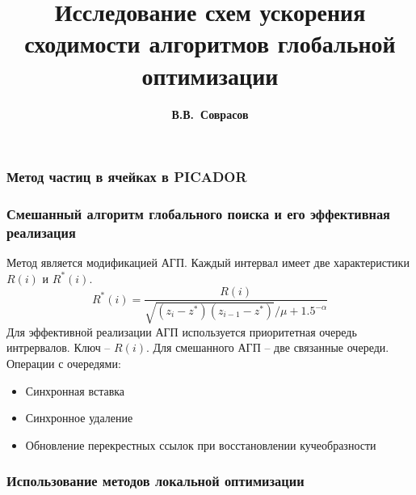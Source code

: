 \documentclass{beamer}
\title{Исследование схем ускорения сходимости алгоритмов глобальной оптимизации}
\author{\textbf{В.В.~Соврасов}}
\institute{ННГУ им. Н.И. Лобачевского}
\date{}
\begin{document}
\begin{frame}
\titlepage
\end{frame}

\begin{frame}
\frametitle{Метод частиц в ячейках в PICADOR}
    \begin{figure}
    \end{figure}
\end{frame}

\begin{frame}
\frametitle{Смешанный алгоритм глобального поиска и его эффективная реализация}
Метод является модификацией АГП. Каждый интервал имеет две
характеристики \(R(i)\) и \(R^*(i)\).
  \begin{displaymath}
  R^*(i)=\frac{R(i)}{\sqrt{(z_i-z^*)(z_{i-1}-z^*)}/\mu + 1.5^{-\alpha}}
  \end{displaymath}
  Для эффективной реализации АГП используется приоритетная
  очередь интрервалов. Ключ – \(R(i)\).
  Для смешанного АГП – две связанные очереди.
  Операции с очередями:
  \begin{itemize}
    \item Синхронная вставка
    \item Синхронное удаление
    \item Обновление перекрестных ссылок при восстановлении кучеобразности
  \end{itemize}
\end{frame}

\begin{frame}
\frametitle{Использование методов локальной оптимизации}

    \begin{figure}
    \end{figure}
\end{frame}
\end{document}
